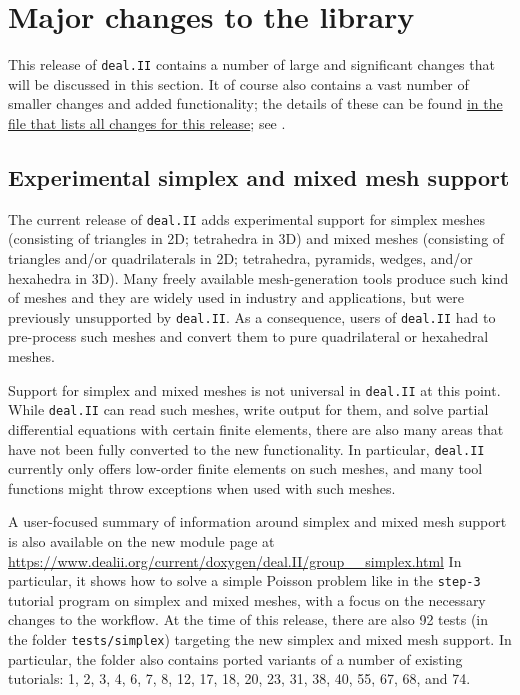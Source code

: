 \documentclass{ansarticle-preprint}
\newcommand{\specialword}[1]{\texttt{#1}}
\newcommand{\dealii}{{\specialword{deal.II}}\xspace}
\begin{document}
\section{Major changes to the library}
\label{sec:major}

This release of \dealii{} contains a number of large and significant changes
that will be discussed in this section.
It of course also contains a
vast number of smaller changes and added functionality; the details of these
can be found
\href{https://dealii.org/developer/doxygen/deal.II/changes_between_9_2_0_and_9_3_0.html}
{in the file that lists all changes for this release}; see \cite{changes93}.


\subsection{Experimental simplex and mixed mesh support}
\label{subsec:simplex}

The current release of \dealii adds experimental support for simplex
meshes (consisting of triangles in 2D; tetrahedra in 3D) and mixed meshes (consisting of triangles and/or
quadrilaterals in 2D; tetrahedra, pyramids, wedges, and/or hexahedra in 3D).
Many freely available mesh-generation tools produce such kind of
meshes and they are widely used in industry and applications, but were
previously unsupported by \dealii. As a consequence, users of \dealii
had to pre-process such meshes and convert them to pure quadrilateral
or hexahedral meshes.

Support for simplex and mixed meshes is not universal in \dealii{} at
this point. While \dealii{} can read such meshes, write output for
them, and solve partial differential equations with certain finite
elements, there are also many areas that have not been fully converted
to the new functionality. In particular, \dealii{} currently only
offers low-order finite elements on such meshes, and many tool
functions might throw exceptions when used with such meshes.


A user-focused summary of information around simplex and mixed mesh
support is also available on the new module page at
  \url{https://www.dealii.org/current/doxygen/deal.II/group__simplex.html}
In particular, it shows how to solve a simple Poisson problem like in
the \texttt{step-3} tutorial program
on simplex and mixed meshes, with a focus on the necessary changes to
the workflow.
At the time of this release, there are also 92 tests (in the folder \texttt{tests/simplex})
targeting the new simplex and mixed mesh support. In particular, the folder also
contains ported variants of a number of existing tutorials: 1, 2, 3, 4, 6, 7, 8, 12, 17, 18, 20, 23, 31, 38,
40, 55, 67, 68, and 74.
\end{document}
